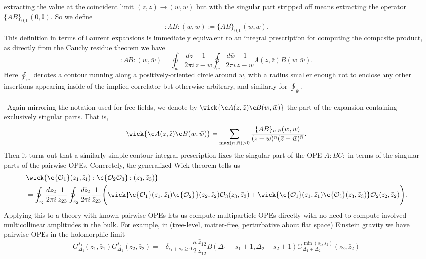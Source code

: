\documentclass[11pt,letterpaper]{article}
\newcommand{\mc}[1]{\mathcal{#1}}
\begin{document}
extracting the value at the coincident limit $(z, \bar{z}) \to (w, \bar{w})$ but with the singular part stripped off means extracting the operator $\{AB\}_{0,0}(0,0)$. So we define\begin{equation}
:AB:(w, \bar{w}) := \{AB\}_{0,0} (w, \bar{w}).
\end{equation}
This definition in terms of Laurent expansions is immediately equivalent to an integral prescription for computing the composite product, as directly from the Cauchy residue theorem we have \begin{equation}
:AB:(w, \bar{w}) = \oint_w \frac{dz}{2\pi i} \frac{1}{z - w} \oint_{\bar{w}} \frac{d \bar{w}}{2 \pi i} \frac{1}{\bar{z} - \bar{w}} A(z, \bar{z}) B(w, \bar{w}).
\end{equation}
Here $\oint_w$ denotes a contour running along a positively-oriented circle around $w$, with a radius smaller enough not to enclose any other insertions appearing inside of the implied correlator but otherwise arbitrary, and similarly for $\oint_{\bar{w}}$.\\
\\
\
Again mirroring the notation used for free fields, we denote by $\wick{\c A(z, \bar{z}) \c B(w, \bar{w})}$ the part of the expansion containing exclusively singular parts. That is, \begin{equation}
\wick{\c A(z, \bar{z}) \c B(w, \bar{w})} = \sum_{\max (n, \bar{n}) > 0} \frac{\{ AB \}_{n, \bar{n}}(w, \bar{w})}{(z - w)^n (\bar{z} - \bar{w})^{\bar{n}}}.
\end{equation}
Then it turns out that a similarly simple contour integral prescription fixes the singular part of the OPE $A:BC:$ in terms of the singular parts of the pairwise OPEs. Concretely, the generalized Wick theorem \cite{DiFrancesco:1997nk} tells us \begin{equation}\label{generalizedwick}
\begin{aligned}
& \wick{\c{\mc{O}_1}(z_1, \bar{z}_1) : \c{\mc{O}_2 \mc{O}_3}: (z_3, \bar{z}_3)} \\
& = \oint_{z_2} \frac{dz_2}{2 \pi i} \frac{1}{z_{23}} \oint_{\bar{z}_2} \frac{d \bar{z}_2}{2 \pi i} \frac{1}{\bar{z}_{23}} \Bigg( \wick{\c{\mc{O}_1} (z_1, \bar{z}_1) \c{\mc{O}_2} }(z_2, \bar{z}_2) \mc{O}_3(z_3, \bar{z}_3) + \wick{ \c{\mc{O}_1}(z_1, \bar{z}_1)  \c{\mc{O}_3}(z_3, \bar{z}_3) } \mc{O}_2(z_2, \bar{z}_2) \Bigg).
\end{aligned}
\end{equation}
Applying this to a theory with known pairwise OPEs lets us compute multiparticle OPEs directly with no need to compute involved multicollinear amplitudes in the bulk. For example, in (tree-level, matter-free, perturbative about flat space) Einstein gravity we have pairwise OPEs in the holomorphic limit \cite{Pate:2019lpp} \begin{equation}
G_{\Delta_1}^{s_1} (z_1, \bar{z}_1) G_{\Delta_1}^{s_2} (z_2, \bar{z}_2) = - \delta_{s_1 + s_2 \geq 0} \frac{\kappa}{2} \frac{\bar{z}_{12}}{z_{12}} B(\Delta_1 - s_1 + 1, \Delta_2 - s_2 + 1) G^{\min (s_1, s_2)}_{\Delta_1 + \Delta_2} (z_2, \bar{z}_2)
\end{equation}
\end{document}
